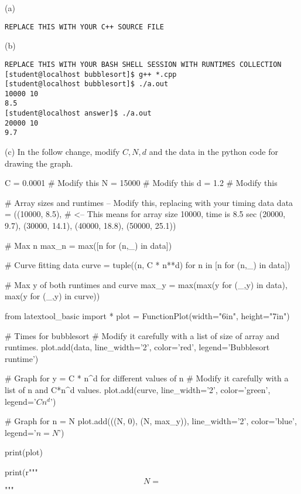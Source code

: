 
(a)
\begin{Verbatim}[frame=single, fontsize=\small]
REPLACE THIS WITH YOUR C++ SOURCE FILE
\end{Verbatim}

(b)
\begin{Verbatim}[frame=single, fontsize=\small]
REPLACE THIS WITH YOUR BASH SHELL SESSION WITH RUNTIMES COLLECTION
[student@localhost bubblesort]$ g++ *.cpp
[student@localhost bubblesort]$ ./a.out
10000 10
8.5
[student@localhost answer]$ ./a.out
20000 10
9.7
\end{Verbatim}

(c) In the follow change, modify $C, N, d$ and the data in the
python code for drawing the graph.

\begin{python}
C = 0.0001                  # Modify this 
N = 15000                   # Modify this
d = 1.2                     # Modify this

# Array sizes and runtimes -- Modify this, replacing with your timing data
data = ((10000, 8.5),    # <-- This means for array size 10000, time is 8.5 sec
        (20000, 9.7),
        (30000, 14.1),
        (40000, 18.8),
        (50000, 25.1))

# Max n
max_n = max([n for (n,_) in data])

# Curve fitting data
curve = tuple((n, C * n**d) for n in [n for (n,_) in data])

# Max y of both runtimes and curve
max_y = max(max(y for (_,y) in data), max(y for (_,y) in curve))

from latextool_basic import *
plot = FunctionPlot(width="6in", height="7in")

# Times for bubblesort
# Modify it carefully with a list of size of array and runtimes.
plot.add(data, line_width='2', color='red', legend='Bubblesort runtime')

# Graph for y = C * n^d for different values of n
# Modify it carefully with a list of n and C*n^d values.
plot.add(curve,
         line_width='2', color='green', legend='$Cn^{d}$')

# Graph for n = N
plot.add(((N, 0),
          (N, max_y)),
          line_width='2', color='blue', legend='$n = N$')

print(plot)

print(r"""
\[
N = %
\]
""" %
\end{python}

